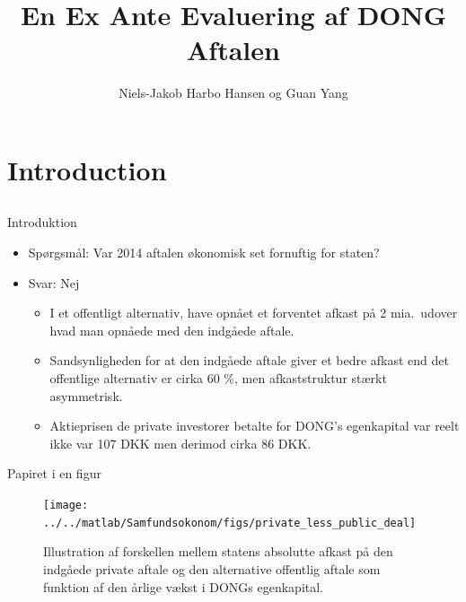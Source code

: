 \documentclass{beamer}
\title[DONG]{En Ex Ante Evaluering af DONG Aftalen}
\author{Niels-Jakob Harbo Hansen og Guan Yang}
\begin{document}
\begin{frame}
\maketitle
\end{frame}

\section{Introduction}
\subsection{}

\begin{frame}{Introduktion}

\begin{itemize}

\item Spørgsmål: Var 2014 aftalen økonomisk set fornuftig for staten?
\pause
\item Svar: Nej 
\pause
\begin{itemize}
\item I et offentligt alternativ, have opnået et forventet afkast på 2 mia.\ udover hvad man opnåede med den indgåede aftale.
\pause
\item  Sandsynligheden for at den indgåede aftale giver et bedre afkast end det offentlige alternativ er cirka 60 \%, men  afkaststruktur stærkt asymmetrisk.
\pause
\item Aktieprisen de private investorer betalte for DONG's egenkapital var reelt ikke var 107 DKK men derimod cirka 86 DKK. \end{itemize} 

\end{itemize}

\end{frame}

\begin{frame}{Papiret i en figur}

\begin{figure}
\texttt{[image: ../../matlab/Samfundsokonom/figs/private\_less\_public\_deal]}
\caption{\footnotesize Illustration af forskellen mellem statens absolutte afkast på den indgåede private aftale og den alternative offentlig aftale som funktion af den årlige vækst i DONGs egenkapital. }
\label{fig:comp}
\end{figure}

\end{frame}
\end{document}
